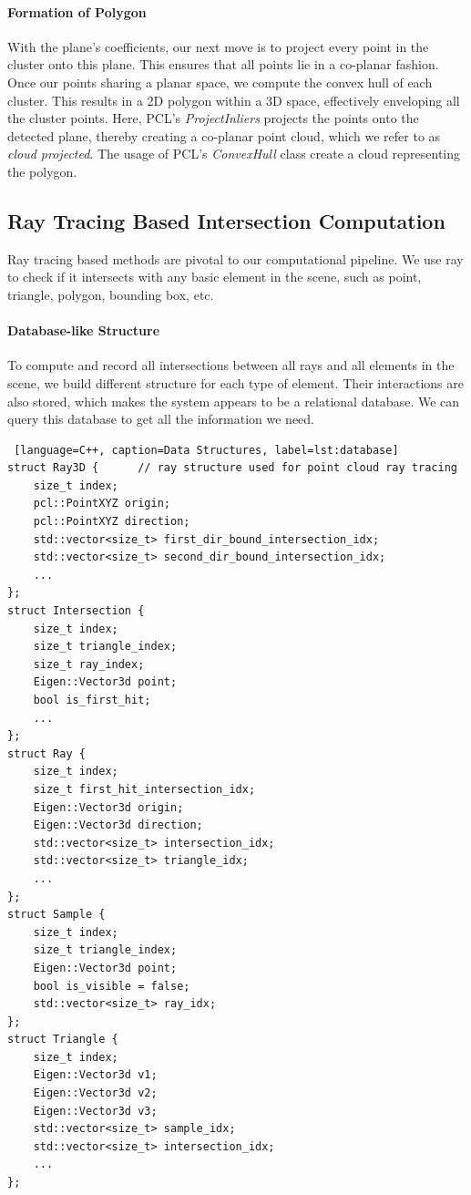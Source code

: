 \documentclass[11pt, a4paper,oneside,chapterprefix=false]{scrbook}
\begin{document}
\paragraph{Formation of Polygon}

With the plane's coefficients, our next move is to project every point in the cluster onto this plane. This ensures that all points lie in a co-planar fashion. Once our points sharing a planar space, we compute the convex hull of each cluster. This results in a 2D polygon within a 3D space, effectively enveloping all the cluster points. Here, PCL's \emph{ProjectInliers} projects the points onto the detected plane, thereby creating a co-planar point cloud, which we refer to as \emph{cloud projected}. The usage of PCL's \emph{ConvexHull} class create a cloud representing the polygon.


\subsection{Ray Tracing Based Intersection Computation} \label{sec:ray tracing}

Ray tracing based methods are pivotal to our computational pipeline. We use ray to check if it intersects with any basic element in the scene, such as point, triangle, polygon, bounding box, etc.

\paragraph{Database-like Structure}

To compute and record all intersections between all rays and all elements in the scene, we build different structure for each type of element. Their interactions are also stored, which makes the system appears to be a relational database. We can query this database to get all the information we need.  

\begin{lstlisting} [language=C++, caption=Data Structures, label=lst:database]
struct Ray3D {      // ray structure used for point cloud ray tracing
    size_t index;
    pcl::PointXYZ origin;
    pcl::PointXYZ direction;
    std::vector<size_t> first_dir_bound_intersection_idx;
    std::vector<size_t> second_dir_bound_intersection_idx;
    ...
};
struct Intersection {
    size_t index;
    size_t triangle_index;
    size_t ray_index;
    Eigen::Vector3d point;
    bool is_first_hit;
    ...
};
struct Ray { 
    size_t index;
    size_t first_hit_intersection_idx;
    Eigen::Vector3d origin;
    Eigen::Vector3d direction;
    std::vector<size_t> intersection_idx;
    std::vector<size_t> triangle_idx;
    ...
};
struct Sample {
    size_t index;
    size_t triangle_index;
    Eigen::Vector3d point;
    bool is_visible = false;
    std::vector<size_t> ray_idx;
};
struct Triangle {
    size_t index;
    Eigen::Vector3d v1;
    Eigen::Vector3d v2;
    Eigen::Vector3d v3;
    std::vector<size_t> sample_idx;
    std::vector<size_t> intersection_idx;
    ...
};

\end{lstlisting}
\end{document}
